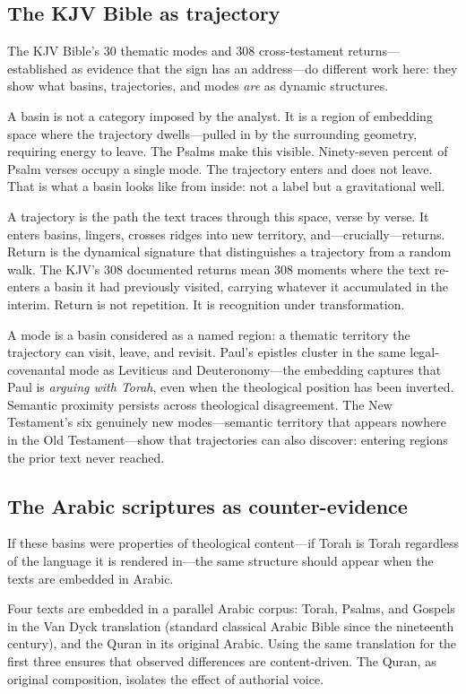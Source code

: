 \subsection{The KJV Bible as trajectory}

The KJV Bible's 30 thematic modes and 308 cross-testament returns---established as evidence that the sign has an address---do different work here: they show what basins, trajectories, and modes \emph{are} as dynamic structures.

A basin is not a category imposed by the analyst. It is a region of embedding space where the trajectory dwells---pulled in by the surrounding geometry, requiring energy to leave. The Psalms make this visible. Ninety-seven percent of Psalm verses occupy a single mode. The trajectory enters and does not leave. That is what a basin looks like from inside: not a label but a gravitational well.

A trajectory is the path the text traces through this space, verse by verse. It enters basins, lingers, crosses ridges into new territory, and---crucially---returns. Return is the dynamical signature that distinguishes a trajectory from a random walk. The KJV's 308 documented returns mean 308 moments where the text re-enters a basin it had previously visited, carrying whatever it accumulated in the interim. Return is not repetition. It is recognition under transformation.

A mode is a basin considered as a named region: a thematic territory the trajectory can visit, leave, and revisit. Paul's epistles cluster in the same legal-covenantal mode as Leviticus and Deuteronomy---the embedding captures that Paul is \emph{arguing with Torah}, even when the theological position has been inverted. Semantic proximity persists across theological disagreement. The New Testament's six genuinely new modes---semantic territory that appears nowhere in the Old Testament---show that trajectories can also discover: entering regions the prior text never reached.

\subsection{The Arabic scriptures as counter-evidence}

If these basins were properties of theological content---if Torah is Torah regardless of the language it is rendered in---the same structure should appear when the texts are embedded in Arabic.

Four texts are embedded in a parallel Arabic corpus: Torah, Psalms, and Gospels in the Van Dyck translation (standard classical Arabic Bible since the nineteenth century), and the Quran in its original Arabic. Using the same translation for the first three ensures that observed differences are content-driven. The Quran, as original composition, isolates the effect of authorial voice.


